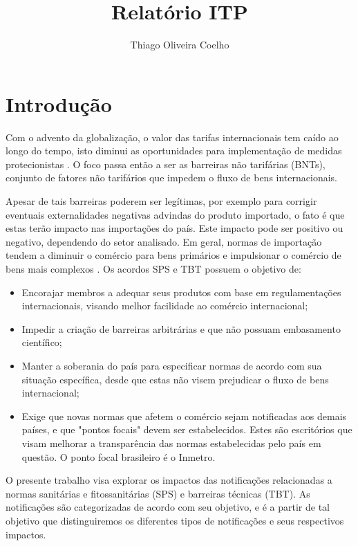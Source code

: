 \documentclass[12pt, a4paper]{article}
\title{Relatório ITP}
\author{Thiago Oliveira Coelho}
\begin{document}
\maketitle

\tableofcontents

\clearpage

\section{Introdução}

Com o advento da globalização, o valor das tarifas internacionais tem caído ao longo do tempo, isto diminui as oportunidades para implementação de medidas protecionistas \cite{maskus2000quantifying}. O foco passa então a ser as barreiras não tarifárias (BNTs), conjunto de fatores não tarifários que impedem o fluxo de bens internacionais.

Apesar de tais barreiras poderem ser legítimas, por exemplo para corrigir eventuais externalidades negativas advindas do produto importado,  o fato é que estas terão impacto nas importações do país. Este impacto pode ser positivo ou negativo, dependendo do setor analisado. Em geral, normas de importação tendem a diminuir o comércio para bens primários e impulsionar o comércio de bens mais complexos \cite{moenius}. Os acordos SPS e TBT possuem o objetivo de:

\begin{itemize}
    \item Encorajar membros a adequar seus produtos com base em regulamentações internacionais, visando melhor facilidade ao comércio internacional;
    \item Impedir a criação de barreiras arbitrárias e que não possuam embasamento científico;
    \item Manter a soberania do país para especificar normas de acordo com sua situação específica, desde que estas não visem prejudicar o fluxo de bens internacional;
    \item Exige que novas normas que afetem o comércio sejam notificadas aos demais países, e que "pontos focais" devem ser estabelecidos. Estes são escritórios que visam melhorar a  transparência das normas estabelecidas pelo país em questão. O ponto focal brasileiro é o Inmetro.
\end{itemize}

O presente trabalho visa explorar os impactos das notificações relacionadas a normas sanitárias e fitossanitárias  (SPS) e barreiras técnicas  (TBT). As notificações são categorizadas de acordo com seu objetivo, e é a partir de tal objetivo que distinguiremos os diferentes tipos de notificações e seus respectivos impactos.
\end{document}
